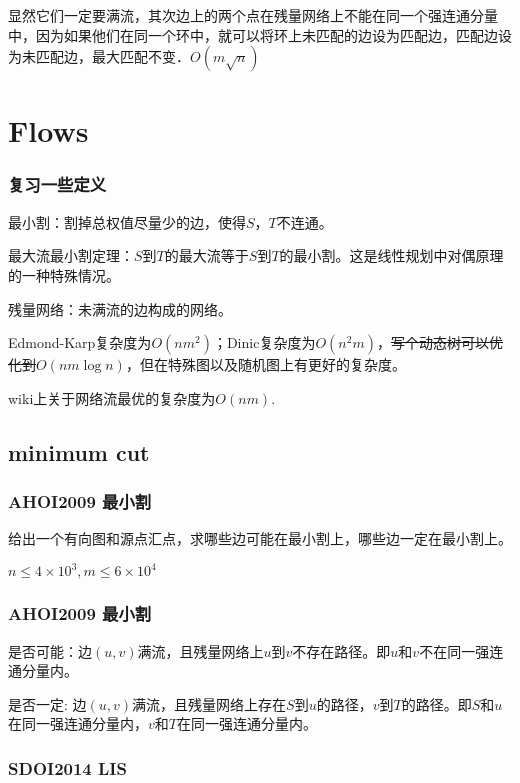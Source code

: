 \documentclass[10pt]{beamer}
\begin{document}
\begin{CJK}{UTF8}{gkai}
\begin{spacing}{1.1}
\begin{frame}
	显然它们一定要满流，其次边上的两个点在残量网络上不能在同一个强连通分量中，因为如果他们在同一个环中，就可以将环上未匹配的边设为匹配边，匹配边设为未匹配边，最大匹配不变．$O(m\sqrt{n})$

\end{frame}

\section{Flows}

\begin{frame}
\frametitle{复习一些定义}

	最小割：割掉总权值尽量少的边，使得$S$，$T$不连通。

	最大流最小割定理：$S$到$T$的最大流等于$S$到$T$的最小割。这是线性规划中对偶原理的一种特殊情况。

	残量网络：未满流的边构成的网络。\pause

	Edmond-Karp复杂度为$O(nm^2)$；Dinic复杂度为$O(n^2m)$，\sout{写个动态树可以优化到$O(nm\log n)$}，但在特殊图以及随机图上有更好的复杂度。

	wiki上关于网络流最优的复杂度为$O(nm)$.

\end{frame}

\subsection{minimum cut}

\begin{frame}
\frametitle{AHOI2009 最小割}
	
	给出一个有向图和源点汇点，求哪些边可能在最小割上，哪些边一定在最小割上。

	$n \le 4 \times 10^3, m \le 6 \times 10^4$

\end{frame}

\begin{frame}
\frametitle{AHOI2009 最小割}

	是否可能：边$(u, v)$满流，且残量网络上$u$到$v$不存在路径。即$u$和$v$不在同一强连通分量内。\pause

	是否一定: 边$(u, v)$满流，且残量网络上存在$S$到$u$的路径，$v$到$T$的路径。即$S$和$u$在同一强连通分量内，$v$和$T$在同一强连通分量内。

\end{frame}

\begin{frame}
\frametitle{SDOI2014 LIS}
	

\end{frame}
\end{spacing}
\end{CJK}
\end{document}
